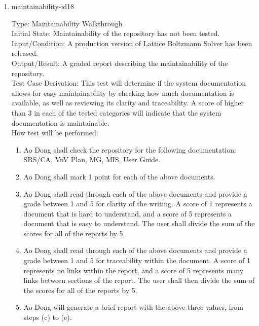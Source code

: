 \documentclass[12pt, titlepage]{article}
\newcommand{\myprogname}{Lattice Boltzmann Solver}
\begin{document}
\begin{enumerate}

\item{maintainability-id18\\}

Type: Maintainability Walkthrough\\
					
Initial State: Maintainability of the repository has not been tested.\\
					
Input/Condition: A production version of {\myprogname} has been released.\\
					
Output/Result: A graded report describing the maintainability of the repository.\\

Test Case Derivation: This test will determine if the system documentation allows for easy maintainability by checking how much documentation is available, as well as reviewing its clarity and traceability. A score of higher than 3 in each of the tested categories will indicate that the system documentation is maintainable.\\ 
					
How test will be performed: 

\begin{enumerate}
\item Ao Dong shall check the repository for the following documentation: SRS/CA, VnV Plan, MG, MIS, User Guide.
\item Ao Dong shall mark 1 point for each of the above documents.
\item Ao Dong shall read through each of the above documents and provide a grade between 1 and 5 for clarity of the writing. A score of 1 represents a document that is hard to understand, and a score of 5 represents a document that is easy to understand. The user shall divide the sum of the scores for all of the reports by 5.
\item Ao Dong shall read through each of the above documents and provide a grade between 1 and 5 for traceability within the document. A score of 1 represents no links within the report, and a score of 5 represents many links between sections of the report. The user shall then divide the sum of the scores for all of the reports by 5.
\item Ao Dong will generate a brief report with the above three values, from steps (c) to (e).\\
\end{enumerate}

\end{enumerate}
\end{document}
